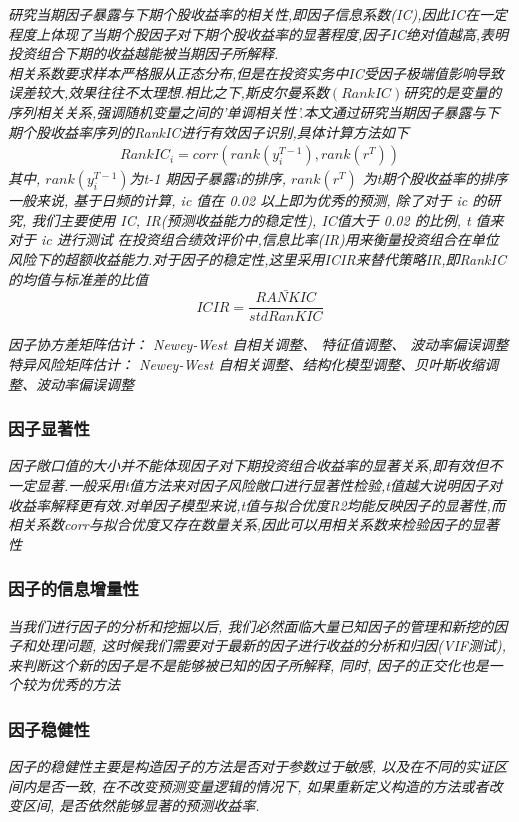 \documentclass{scrartcl}
\numberwithin{equation}{section}
\begin{document}
\textsl{
    研究当期因子暴露与下期个股收益率的相关性,即因子信息系数(IC),因此IC在一定程度上体现了当期个股因子对下期个股收益率的显著程度,因子IC绝对值越高,表明投资组合下期的收益越能被当期因子所解释.\\
    相关系数要求样本严格服从正态分布,但是在投资实务中IC受因子极端值影响导致误差较大,效果往往不太理想.相比之下,斯皮尔曼系数$(RankIC)$研究的是变量的序列相关关系,强调随机变量之间的'单调相关性'.本文通过研究当期因子暴露与下期个股收益率序列的RankIC进行有效因子识别,具体计算方法如下}
\begin{equation}
    \begin{aligned}
        RankIC_i = corr(rank(y^{T-1}_i), rank(r^T))
    \end{aligned}
\end{equation}
\textsl{
    其中, $rank(y^{T-1}_i)$为t-1 期因子暴露i的排序, $ rank(r^T)$ 为t期个股收益率的排序
}
\textsl{一般来说, 基于日频的计算, ic 值在 0.02 以上即为优秀的预测, 除了对于 ic 的研究, 我们主要使用 IC, IR(预测收益能力的稳定性), IC值大于 0.02 的比例, t 值来对于 ic 进行测试}
\textsl{
    在投资组合绩效评价中,信息比率(IR)用来衡量投资组合在单位风险下的超额收益能力.对于因子的稳定性,这里采用ICIR来替代策略IR,即RankIC的均值与标准差的比值$$ICIR =\frac {\bar{RANKIC}}{std RanKIC}$$
}

\textsl{因子协方差矩阵估计： Newey-West 自相关调整、 特征值调整、 波动率偏误调整
    特异风险矩阵估计： Newey-West 自相关调整、结构化模型调整、贝叶斯收缩调整、波动率偏误调整
}

\subsubsection{因子显著性}
\textsl{
    因子敞口值的大小并不能体现因子对下期投资组合收益率的显著关系,即有效但不一定显著.一般采用t值方法来对因子风险敞口进行显著性检验,t值越大说明因子对收益率解释更有效.对单因子模型来说,t值与拟合优度R2均能反映因子的显著性,而相关系数corr与拟合优度又存在数量关系,因此可以用相关系数来检验因子的显著性}

\subsubsection{因子的信息增量性}
\textsl{
当我们进行因子的分析和挖掘以后, 我们必然面临大量已知因子的管理和新挖的因子和处理问题, 这时候我们需要对于最新的因子进行收益的分析和归因(VIF测试), 来判断这个新的因子是不是能够被已知的因子所解释, 同时, 因子的正交化也是一个较为优秀的方法
}
\subsubsection{因子稳健性}
\textsl{
    因子的稳健性主要是构造因子的方法是否对于参数过于敏感, 以及在不同的实证区间内是否一致, 在不改变预测变量逻辑的情况下, 如果重新定义构造的方法或者改变区间, 是否依然能够显著的预测收益率.
}
\end{document}
